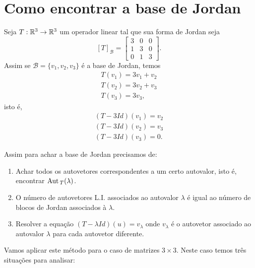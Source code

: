 
\section{Como encontrar a base de Jordan} %
\label{sec:base_de_jordan}

Seja $T : \mathbb{R}^3 \to \mathbb{R}^3$ um operador linear tal que sua forma de Jordan seja
\[
	[T]_\mathcal{B} = \begin{bmatrix}
		3 & 0 & 0\\
		1 & 3 & 0\\
		0 & 1 & 3
	\end{bmatrix}.
\]
Assim se $\mathcal{B} = \{v_1, v_2, v_3\}$ \'e a base de Jordan, temos
\begin{align*}
	T(v_1) = 3v_1 + v_2\\
	T(v_2) = 3v_2 + v_3\\
	T(v_3) = 3v_3,
\end{align*}
isto \'e,
\begin{align*}
	(T- 3Id)(v_1) = v_2\\
	(T - 3Id)(v_2) = v_3\\
	(T - 3Id)(v_3) = 0.
\end{align*}

Assim para achar a base de Jordan precisamos de:
\begin{enumerate}[label={\roman*})]
	\item Achar todos os autovetores correspondentes a um certo autovalor, isto \'e, encontrar ${\rm Aut\,}_T(\lambda)$.
	\item O n\'umero de autovetores L.I. associados ao autovalor $\lambda$ \'e igual ao n\'umero de blocos de Jordan associados \`a $\lambda$.
	\item Resolver a equa\c{c}\~ao $(T - \lambda Id)(u) = v_\lambda$ onde $v_\lambda$ \'e o autovetor associado ao autovalor $\lambda$ para cada autovetor diferente.
\end{enumerate}

Vamos aplicar este m\'etodo para o caso de matrizes $3 \times 3$. Neste caso temos tr\^es situa\c{c}\~oes para analisar:


